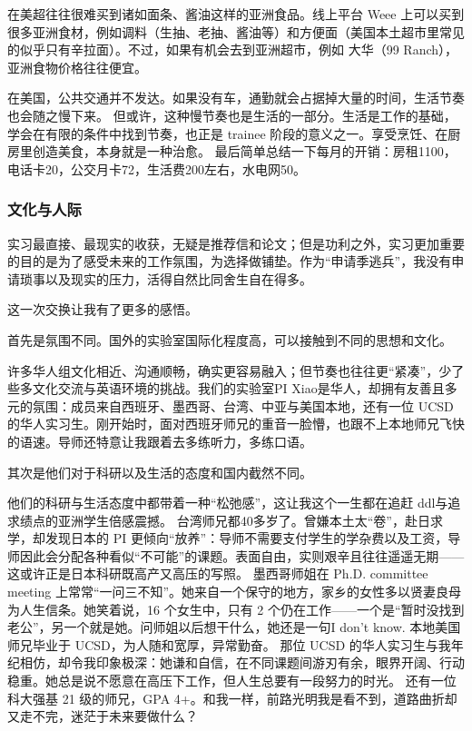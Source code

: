 在美超往往很难买到诸如面条、酱油这样的亚洲食品。线上平台 Weee 上可以买到很多亚洲食材，例如调料（生抽、老抽、酱油等）和方便面（美国本土超市里常见的似乎只有辛拉面）。不过，如果有机会去到亚洲超市，例如 大华（99 Ranch），亚洲食物价格往往便宜。

在美国，公共交通并不发达。如果没有车，通勤就会占据掉大量的时间，生活节奏也会随之慢下来。
但或许，这种慢节奏也是生活的一部分。生活是工作的基础，学会在有限的条件中找到节奏，也正是 trainee 阶段的意义之一。享受烹饪、在厨房里创造美食，本身就是一种治愈。
最后简单总结一下每月的开销：房租1100，电话卡20，公交月卡72，生活费200左右，水电网50。

\subsubsection*{文化与人际}

实习最直接、最现实的收获，无疑是推荐信和论文；但是功利之外，实习更加重要的目的是为了感受未来的工作氛围，为选择做铺垫。作为“申请季逃兵”，我没有申请琐事以及现实的压力，活得自然比同舍生自在得多。

这一次交换让我有了更多的感悟。

首先是氛围不同。国外的实验室国际化程度高，可以接触到不同的思想和文化。

许多华人组文化相近、沟通顺畅，确实更容易融入；但节奏也往往更“紧凑”，少了些多文化交流与英语环境的挑战。我们的实验室PI Xiao是华人，却拥有友善且多元的氛围：成员来自西班牙、墨西哥、台湾、中亚与美国本地，还有一位 UCSD 的华人实习生。刚开始时，面对西班牙师兄的重音一脸懵，也跟不上本地师兄飞快的语速。导师还特意让我跟着去多练听力，多练口语。

其次是他们对于科研以及生活的态度和国内截然不同。

他们的科研与生活态度中都带着一种“松弛感”，这让我这个一生都在追赶 ddl与追求绩点的亚洲学生倍感震撼。  
台湾师兄都40多岁了。曾嫌本土太“卷”，赴日求学，却发现日本的 PI 更倾向“放养”：导师不需要支付学生的学杂费以及工资，导师因此会分配各种看似“不可能”的课题。表面自由，实则艰辛且往往遥遥无期——这或许正是日本科研既高产又高压的写照。  
墨西哥师姐在 Ph.D. committee meeting 上常常“一问三不知”。她来自一个保守的地方，家乡的女性多以贤妻良母为人生信条。她笑着说，16 个女生中，只有 2 个仍在工作——一个是“暂时没找到老公”，另一个就是她。问师姐以后想干什么，她还是一句I don't know.
本地美国师兄毕业于 UCSD，为人随和宽厚，异常勤奋。
那位 UCSD 的华人实习生与我年纪相仿，却令我印象极深：她谦和自信，在不同课题间游刃有余，眼界开阔、行动稳重。她总是说不愿意在高压下工作，但人生总要有一段努力的时光。
还有一位科大强基 21 级的师兄，GPA 4+。和我一样，前路光明我是看不到，道路曲折却又走不完，迷茫于未来要做什么？

